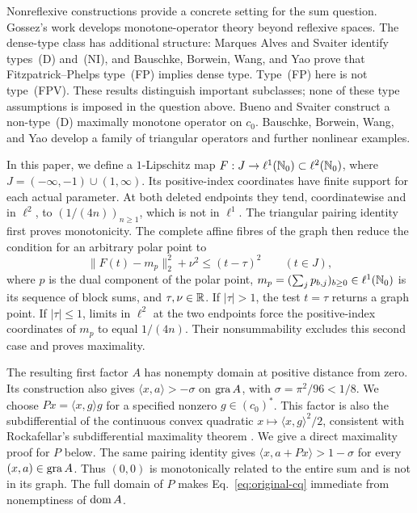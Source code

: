 Nonreflexive constructions provide a concrete setting for the sum question.
Gossez's work \cite{gossez1971} develops monotone-operator theory beyond
reflexive spaces. The dense-type class has additional structure:
Marques Alves and Svaiter \cite{marquessvaiter2010} identify types~(D)
and~(NI), and Bauschke, Borwein, Wang, and Yao \cite{bauschkefp2012}
prove that Fitzpatrick--Phelps type~(FP) implies dense type.
Type~(FP) here is not type~(FPV). These results distinguish important
subclasses; none of these type assumptions is imposed in the question above.
Bueno and Svaiter \cite{buenosvaiter2011} construct a non-type~(D)
maximally monotone operator on $c_0$. Bauschke, Borwein, Wang, and Yao
\cite{bauschkeetal2011} develop a family of triangular operators and
further nonlinear examples. 

In this paper, we define a $1$-Lipschitz map
$F:J\to\ell^1(\mathbb N_0)\subset\ell^2(\mathbb N_0)$, where
$J=(-\infty,-1)\cup(1,\infty)$. Its positive-index coordinates have finite
support for each actual parameter. At both deleted endpoints they tend,
coordinatewise and in $\ell^2$, to
$(1/(4n))_{n\ge1}$, which is not in $\ell^1$.
The triangular pairing identity first proves monotonicity. The complete
affine fibres of the graph then reduce the condition for an arbitrary
polar point to
\begin{equation}
\|F(t)-m_p\|_2^2+\nu^2\le(t-\tau)^2
\qquad(t\in J),
\label{eq:polar-intro}
\end{equation}
where $p$ is the dual component of the polar point,
$m_p=(\sum_j p_{b,j})_{b\ge0}\in\ell^1(\mathbb N_0)$ is its sequence of
block sums, and $\tau,\nu\in\mathbb R$. If $|\tau|>1$, the test $t=\tau$ returns a graph
point. If $|\tau|\le1$, limits in $\ell^2$ at the two endpoints
force the positive-index coordinates of $m_p$ to equal $1/(4n)$.
Their nonsummability excludes this second case and proves maximality.

The resulting first factor $A$ has nonempty domain at positive distance
from zero. Its construction also gives
$\langle x,a\rangle>-\sigma$ on $\operatorname{gra} A$, with
$\sigma=\pi^2/96<1/8$. We choose
$Px=\langle x,g\rangle g$ for a specified nonzero $g\in(c_0)^*$.
This factor is also the subdifferential of the continuous convex quadratic
$x\mapsto\langle x,g\rangle^2/2$, consistent with Rockafellar's
subdifferential maximality theorem \cite{rockafellar1970subdiff}.
We give a direct maximality proof for $P$ below.
The same pairing identity gives
$\langle x,a+Px\rangle>1-\sigma$ for every $(x,a)\in\operatorname{gra} A$.
Thus $(0,0)$ is monotonically related to the entire sum and is not in
its graph. The full domain of $P$ makes
Eq.~\eqref{eq:original-cq} immediate from nonemptiness of $\operatorname{dom} A$.

